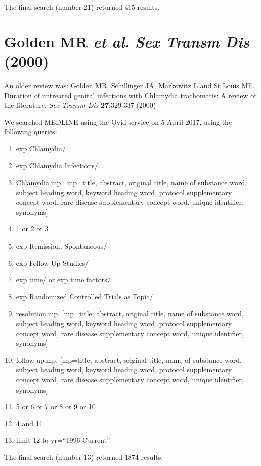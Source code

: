 \documentclass[11pt, oneside]{article}   	%
\begin{document}
The final search (number 21) returned 415 results.

\section{Golden MR \textit{et al. Sex Transm Dis} (2000)}

An older review was: Golden MR, Schillinger JA, Markowitz L and St Louis ME. Duration of untreated genital infections with Chlamydia trachomatis: A review of the literature. \textit{Sex Transm Dis} \textbf{27}:329-337 (2000)

We searched MEDLINE using the Ovid service on 5 April 2017, using the following queries:

\begin{enumerate}

\item{exp Chlamydia/}
\item{exp Chlamydia Infections/}
\item{Chlamydia.mp. [mp=title, abstract, original title, name of substance word, subject heading word, keyword heading word, protocol supplementary concept word, rare disease supplementary concept word, unique identifier, synonyms]}
\item{1 or 2 or 3}
\item{exp Remission, Spontaneous/}
\item{exp Follow-Up Studies/}
\item{exp time/ or exp time factors/}
\item{exp Randomized Controlled Trials as Topic/}
\item{resolution.mp. [mp=title, abstract, original title, name of substance word, subject heading word, keyword heading word, protocol supplementary concept word, rare disease supplementary concept word, unique identifier, synonyms]}
\item{follow-up.mp. [mp=title, abstract, original title, name of substance word, subject heading word, keyword heading word, protocol supplementary concept word, rare disease supplementary concept word, unique identifier, synonyms]}
\item{5 or 6 or 7 or 8 or 9 or 10}
\item{4 and 11}
\item{limit 12 to yr=``1996-Current''}

\end{enumerate}

The final search (number 13) returned 1874 results.
\end{document}
